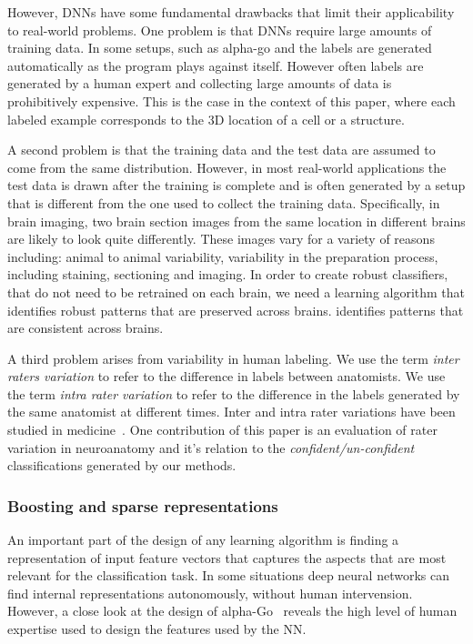 \documentclass[11pt]{article}
\begin{document}
However, DNNs have some fundamental drawbacks that limit their
applicability to real-world problems. One problem is that DNNs
require large amounts of training data.
In some setups, such as alpha-go and the labels are generated automatically as
the program plays against itself. However often labels are generated by a
human expert and collecting large amounts of data is
prohibitively expensive. This is the case in the context of this
paper, where each labeled example corresponds to the 3D location of a
cell or a structure.

A second problem is that the training data and the test data are assumed to
come from the same distribution. However, in most real-world
applications the test data is drawn after the training is complete and
is often generated by a setup that is different from the one used to
collect the training data.
Specifically, in brain imaging, two brain section images from the same
location in different brains are likely to look quite differently.
These images vary for a variety of reasons including: animal to animal variability,
variability in the preparation process, including staining,
sectioning and imaging. In order to create robust classifiers, that do
not need to be retrained on each brain, we need a learning algorithm
that identifies robust patterns that are preserved across brains.
identifies patterns that are consistent across brains.

A third problem arises from variability in human labeling. We use
the term {\em inter raters variation} to refer to the difference in
labels between anatomists. We use the term {\em intra rater
  variation} to refer to the difference in the labels generated by the
same anatomist at different times. Inter and intra rater variations
have been studied in medicine~\cite{gellhorn2013inter}. One
contribution of this paper is an evaluation of rater variation in
neuroanatomy and it's relation to the {\em confident/un-confident}
classifications generated by our methods.

\subsubsection{Boosting and sparse representations}
An important part of the design of any learning algorithm is finding a
representation of input feature vectors that captures the aspects that are
most relevant for the classification task. In some situations deep
neural networks can find internal representations autonomously,
without human intervension. However, a close look at the design of
alpha-Go~\cite{silver2017mastering} reveals the high level of human
expertise used to design the features used by the NN.
\end{document}

